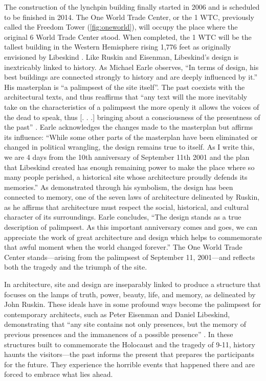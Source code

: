 The construction of the lynchpin building finally started in 2006
and is scheduled to be finished in 2014.  The One World Trade Center,
or the 1 WTC, previously called the Freedom Tower (\ref{fig:oneworld}), will
occupy the place where the original 6 World Trade Center stood.  When
completed, the 1 WTC will be the tallest building in the Western
Hemisphere rising 1,776 feet as originally envisioned by Libeskind \citep{habitat2012}.  Like Ruskin and Eisenman, Libeskind’s design is
inextricably linked to history.  As Michael Earle observes, ``In terms
of design, his best buildings are connected strongly to history and are
deeply influenced by it.''  His masterplan is ``a palimpsest of the site
itself''\citep{earle2012}.  The past coexists with the architectural texts, and
thus reaffirms that ``any text will the more inevitably take on the
characteristics of a palimpsest the more openly it allows the voices of
the dead to speak, thus [. . .] bringing about a consciousness of the
presentness of the past'' \citep[][p.~502]{uhlig1985}.  Earle acknowledges
the changes made to the masterplan but affirms its influence:
``While some other
parts of the masterplan have been eliminated or changed in political
wrangling, the design remains true to itself.  As I write this, we are
4 days from the 10th anniversary of September 11th 2001 and the plan
that Libeskind created has enough remaining power to make the place
where so many people perished, a historical site whose architecture
proudly defends its memories.'' \citep{earle2012}
As demonstrated through his symbolism, the design has been connected to
memory, one of the seven laws of architecture delineated by Ruskin, as
he affirms that architecture must respect the social, historical, and
cultural character of its surroundings.  Earle concludes, ``The design
stands as a true description of palimpsest.  As this important
anniversary comes and goes, we can appreciate the work of great
architecture and design which helps to commemorate that awful moment
when the world changed forever.''\citep{earle2012} The One World Trade Center
stands---arising from the palimpsest of September 11, 2001---and reflects
both the tragedy and the triumph of the site.

In architecture, site and design are inseparably linked to
produce a structure that focuses on the lamps of truth, power, beauty,
life, and memory, as delineated by John Ruskin.  These ideals have in
some profound ways become the palimpsest for contemporary architects,
such as Peter Eisenman and Daniel Libeskind, demonstrating that “any
site contains not only presences, but the memory of previous presences
and the immanences of a possible presence” \citep[][p.~207]{eisenman2004}.  In
these structures built to commemorate the Holocaust and the tragedy of
9-11, history haunts the visitors---the past informs the present that
prepares the participants for the future.  They experience the horrible
events that happened there and are forced to embrace what lies ahead. 

